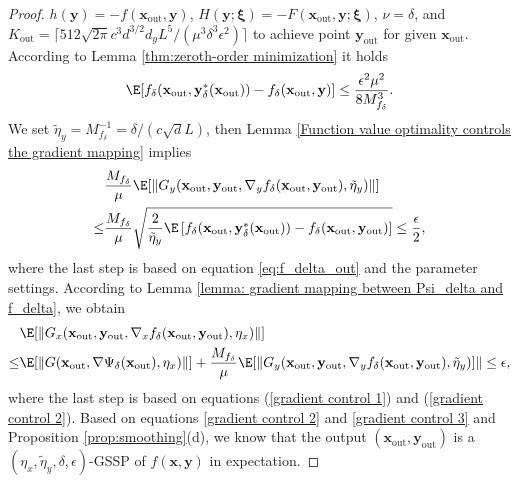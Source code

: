 \documentclass[11pt]{article}
\def\vx{\mathbf{x}}
\def\vy{\mathbf{y}}
\def\vxi{\bm{\xi}}
\newcommand{\norm}[1]{\left\| #1 \right\|}
\begin{document}
\begin{proof}
$h(\vy)=-f(\vx_{\mathrm{out}},\vy)$, $H(\vy;\vxi)=-F(\vx_{\mathrm{out}},\vy;\vxi)$, $\nu=\delta$, and 
$K_{\mathrm{out}}=\lceil{512\sqrt{2\pi }c^3  d^{3/2}d_y L^5}/{(\mu^3\delta^3  \epsilon^2)}\rceil$  
to achieve point $\vy_{\mathrm{out}}$ for given $\vx_{\mathrm{out}}$.
According to Lemma \ref{thm:zeroth-order minimization} 
it holds
\begin{align}\label{eq:f_delta_out}
   \E[ f_\delta(\vx_{\mathrm{out}},\vy_\delta^*(\vx_{\mathrm{out}}))-f_\delta(\vx_{\mathrm{out}},\vy)]\le \frac{ \epsilon^2\mu^2}{8M_{f_\delta}^3}.
\end{align}
We set $\tilde\eta_y= M_{f_\delta}^{-1}=\delta/({c\sqrt{d}L})$, then Lemma \ref{Function value optimality controls the gradient mapping} implies
\begin{align}\label{gradient control 2}
\begin{split}
&\frac{M_{f_\delta}}{\mu}\E[\| G_y(\vx_{\mathrm{out}}, \vy_{\mathrm{out}},\nabla_y f_\delta(\vx_{\mathrm{out}},\vy_{\mathrm{out}}),\tilde\eta_y) 
\|]\\
\le &
\frac{M_{f_\delta}}{\mu}\sqrt{\frac{2}{\tilde\eta_y}\E\left[f_\delta(\vx_{\mathrm{out}},\vy_\delta^*(\vx_{\mathrm{out}}))-f_\delta(\vx_{\mathrm{out}},\vy_{\mathrm{out}})\right]}
\leq
\frac{\epsilon}{2},
\end{split}
\end{align}
where the last step is based on equation \eqref{eq:f_delta_out} and the parameter settings.
According to Lemma \ref{lemma: gradient mapping between Psi_delta and f_delta}, we obtain
\begin{align}\label{gradient control 3}
\begin{split}
&\E[\norm{G_x(\vx_{\mathrm{out}},\vy_{\mathrm{out}},\nabla_x f_\delta(\vx_{\mathrm{out}},\vy_{\mathrm{out}}),\eta_x)}]\\
\leq&
\E[\norm{G(\vx_{\mathrm{out}},\nabla \Psi_\delta(\vx_{\mathrm{out}}),\eta_x)}] + \frac{M_{f_\delta}}{\mu}\E[\| G_y(\vx_{\mathrm{out}}, \vy_{\mathrm{out}},\nabla_y f_\delta(\vx_{\mathrm{out}},\vy_{\mathrm{out}}),\tilde\eta_y)] \|\le\epsilon,
\end{split}
\end{align}
where the last step is based on equations (\ref{gradient control 1}) and (\ref{gradient control 2}). 
Based on equations \eqref{gradient control 2} and \eqref{gradient control 3} and Proposition \ref{prop:smoothing}(d), we know that the output $(\vx_{\mathrm{out}}, \vy_{\mathrm{out}})$ is a $(\eta_x,\tilde{\eta}_y,\delta,\epsilon)$-GSSP of $f(\vx,\vy)$ in expectation.


\end{proof}
\end{document}
